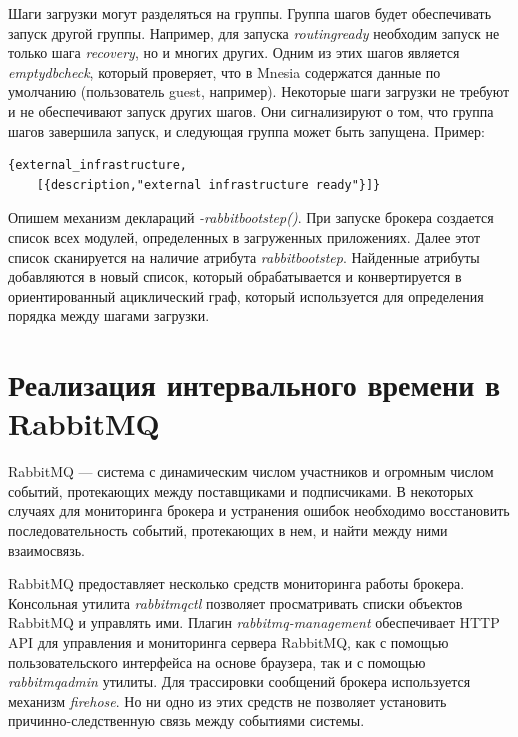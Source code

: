 Шаги загрузки могут разделяться на группы. Группа шагов будет обеспечивать запуск другой группы. Например, для запуска \textit{routing\underline{\hspace{0.25cm}}ready} необходим запуск не только шага \textit{recovery}, но и многих других. Одним из этих шагов является \textit{empty\underline{\hspace{0.25cm}}db\underline{\hspace{0.25cm}}check}, который проверяет, что в Mnesia содержатся данные по умолчанию (пользователь guest, например). Некоторые шаги загрузки не требуют и не обеспечивают запуск других шагов. Они сигнализируют о том, что группа шагов завершила запуск, и следующая группа может быть запущена. Пример:
\begin{lstlisting}
{external_infrastructure,
    [{description,"external infrastructure ready"}]}
\end{lstlisting}
Опишем механизм деклараций \textit{-rabbit\underline{\hspace{0.25cm}}boot\underline{\hspace{0.25cm}}step()}. При запуске брокера создается список всех модулей, определенных в загруженных приложениях. Далее этот список сканируется на наличие атрибута \textit{rabbit\underline{\hspace{0.25cm}}boot\underline{\hspace{0.25cm}}step}. Найденные атрибуты добавляются в новый список, который обрабатывается и конвертируется в ориентированный ациклический граф, который используется для определения порядка между шагами загрузки.

\chapter{Реализация интервального времени в RabbitMQ}
RabbitMQ --- система с динамическим числом участников и огромным числом событий, протекающих между поставщиками и подписчиками. В некоторых случаях для мониторинга брокера и устранения ошибок необходимо восстановить последовательность событий, протекающих в нем, и найти между ними взаимосвязь.

RabbitMQ предоставляет несколько средств мониторинга работы брокера. Консольная утилита \textit{rabbitmqctl} позволяет просматривать списки объектов RabbitMQ и управлять ими. Плагин \textit{rabbitmq-management} обеспечивает HTTP API для управления и мониторинга сервера RabbitMQ, как с помощью пользовательского интерфейса на основе браузера, так и с помощью  \textit{rabbitmqadmin} утилиты. Для трассировки сообщений брокера используется механизм \textit{firehose}. Но ни одно из этих средств не позволяет установить причинно-следственную связь между событиями системы.

